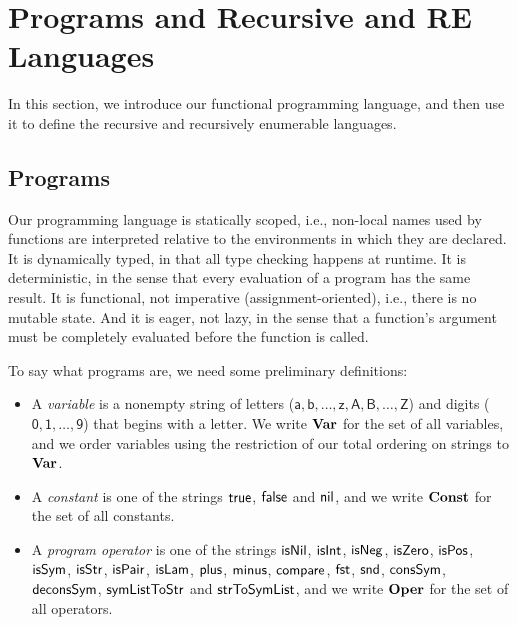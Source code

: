 \section{Programs and Recursive and RE Languages}
\label{ProgramsAndRecursiveAndRELanguages}

In this section, we introduce our functional programming language,
and then use it to define the recursive and recursively enumerable
languages.

\subsection{Programs}

%
Our programming language is statically scoped, i.e., non-local names
used by functions are interpreted relative to the environments in
which they are declared.  It is dynamically typed, in that all type
checking happens at runtime.  It is deterministic, in the sense that
every evaluation of a program has the same result.  It is functional,
not imperative (assignment-oriented), i.e., there is no mutable state.
And it is eager, not lazy, in the sense that a function's argument
must be completely evaluated before the function is called.

To say what programs are, we need some preliminary definitions:
\begin{itemize}
\item A \emph{variable} is a nonempty string of letters
%
%
  ($\mathsf{a,b,\ldots,z,A,B,\ldots,Z}$) and digits
  ($\mathsf{0,1,\ldots,9}$) that begins with a letter.  We write
  $\mathbf{Var}$ for the set of all variables, and we order variables
  using the restriction of our total ordering on strings to
  $\mathbf{Var}$.

\item A \emph{constant} is one of the strings $\mathsf{true}$, $\mathsf{false}$ and
%
%
  $\mathsf{nil}$, and we write $\mathbf{Const}$ for the set of all constants.

\item A \emph{program operator} is one of the strings
%
  $\mathsf{isNil}$, $\mathsf{isInt}$, $\mathsf{isNeg}$, $\mathsf{isZero}$,
  $\mathsf{isPos}$, $\mathsf{isSym}$, $\mathsf{isStr}$, $\mathsf{isPair}$,
  $\mathsf{isLam}$, $\mathsf{plus}$, $\mathsf{minus}$, $\mathsf{compare}$, $\mathsf{fst}$,
  $\mathsf{snd}$, $\mathsf{consSym}$, $\mathsf{deconsSym}$, $\mathsf{symListToStr}$ and
  $\mathsf{strToSymList}$, and we write $\mathbf{Oper}$ for the set of
%
  all operators.
\end{itemize}

